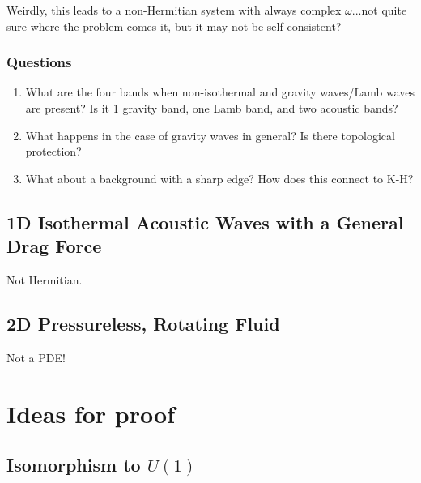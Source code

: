 \documentclass[11pt]{article}
\begin{document}
Weirdly, this leads to a non-Hermitian system with always complex $\omega$...not quite sure where the problem comes it, but it may not be self-consistent?


\subsubsection{Questions}
\label{sec:acoustic_questions}

\begin{enumerate}
\item What are the four bands when non-isothermal and gravity waves/Lamb waves are present? Is it 1 gravity band, one Lamb band, and two acoustic bands?
\item What happens in the case of gravity waves in general? Is there topological protection?
\item What about a background with a sharp edge? How does this connect to K-H?
\end{enumerate}

\subsection{1D Isothermal Acoustic Waves with a General Drag Force }
\label{sec:1D_acoustic_drag}

Not Hermitian.

\subsection{2D Pressureless, Rotating Fluid }
\label{sec:1d_pressureless}

Not a PDE!

\section{Ideas for proof}
\label{sec:proof_ideas}

\subsection{Isomorphism to $U(1)$}
\label{sec:u1_iso}
\end{document}
